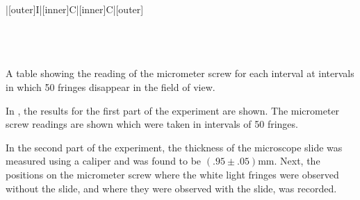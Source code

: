 \begin{paper}
{\begin{papertable}{|[outer]I|[inner]C|[inner]C|[outer]}
	    \papertableindex{}\\\paperiline
	    \papertableindex{}\\\paperiline
	    \papertableindex{}\\\paperiline
	    \papertableindex{}\\\paperoline
	\end{papertable}\vspace{-1.5em}}{A table showing the reading of the micrometer screw for each interval at intervals in which 50 fringes disappear in the field of view.}
	
	In \figCalibrationCurve, the results for the first part of the experiment are shown.
	The micrometer screw readings are shown which were taken in intervals of 50 fringes.
	
	In the second part of the experiment, the thickness of the microscope slide was measured using a caliper and was found to be $(.95\pm.05)\si{\milli\meter}$.
	Next, the positions on the micrometer screw where the white light fringes were observed without the slide, and where they were observed with the slide, was recorded.\\
	
	\\
	

\end{paper}
